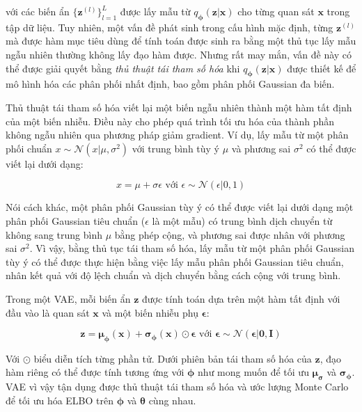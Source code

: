 \documentclass[14pt, a4paper]{article}
\numberwithin{equation}{section}
\numberwithin{figure}{section}
\numberwithin{dl}{section}
\numberwithin{md}{section}
\numberwithin{bd}{section}
\numberwithin{dn}{section}
\numberwithin{hq}{section}
\begin{document}
    với các biến ẩn $\lbrace \boldsymbol{z}^{(l)} \rbrace_{l=1}^L$ được lấy mẫu từ $q_{\boldsymbol{\phi}} (\boldsymbol{z} \vert \boldsymbol{x})$ cho từng quan sát $\boldsymbol{x}$ trong tập dữ liệu.
    Tuy nhiên, một vấn đề phát sinh trong cấu hình mặc định, từng $\boldsymbol{z}^{(l)}$ mà được hàm mục tiêu dùng để tính toán được sinh ra bằng một thủ tục lấy mẫu ngẫu nhiên thường không lấy đạo hàm được.
    Nhưng rất may mắn, vấn đề này có thể được giải quyết bằng \textit{thủ thuật tái tham số hóa} khi $q_{\boldsymbol{\phi}} (\boldsymbol{z} \vert \boldsymbol{x})$ được thiết kế để mô hình hóa các phân phối nhất định, bao gồm phân phối Gaussian đa biến.

    Thủ thuật tái tham số hóa viết lại một biến ngẫu nhiên thành một hàm tất định của một biến nhiễu.
    Điều này cho phép quá trình tối ưu hóa của thành phần không ngẫu nhiên qua phương pháp giảm gradient.
    Ví dụ, lấy mẫu từ một phân phối chuẩn $x \sim \mathcal{N} (x \vert \mu, \sigma^2)$ với trung bình tùy ý $\mu$ và phương sai $\sigma^2$ có thể được viết lại dưới dạng:

    \begin{equation}
        x = \mu + \sigma \epsilon \text{ với } \epsilon \sim \mathcal{N} (\epsilon \vert 0, 1)
    \end{equation}

    Nói cách khác, một phân phối Gaussian tùy ý có thể được viết lại dưới dạng một phân phối Gaussian tiêu chuẩn ($\epsilon$ là một mẫu) có trung bình dịch chuyển từ không sang trung bình $\mu$ bằng phép cộng, và phương sai được nhân với phương sai $\sigma^2$.
    Vì vậy, bằng thủ tục tái tham số hóa, lấy mẫu từ một phân phối Gaussian tùy ý có thể được thực hiện bằng việc lấy mẫu phân phối Gaussian tiêu chuẩn, nhân kết quả với độ lệch chuẩn và dịch chuyển bằng cách cộng với trung bình.

    Trong một VAE, mỗi biến ẩn $\boldsymbol{z}$ được tính toán dựa trên một hàm tất định với đầu vào là quan sát $\boldsymbol{x}$ và một biến nhiễu phụ $\boldsymbol{\epsilon}$:

    \begin{equation}
        \boldsymbol{z} = \boldsymbol{\mu}_{\boldsymbol{\phi}} (\boldsymbol{x}) + \boldsymbol{\sigma}_{\boldsymbol{\phi}} (\boldsymbol{x}) \odot \boldsymbol{\epsilon} \text{ với } \boldsymbol{\epsilon} \sim \mathcal{N} (\boldsymbol{\epsilon} \vert \boldsymbol{0}, \boldsymbol{I})
    \end{equation}

    Với $\odot$ biểu diễn tích từng phần tử.
    Dưới phiên bản tái tham số hóa của $\boldsymbol{z}$, đạo hàm riêng có thể được tính tương ứng với $\boldsymbol{\phi}$ như mong muốn để tối ưu $\boldsymbol{\mu}_{\boldsymbol{\sigma}}$ và $\boldsymbol{\sigma}_{\boldsymbol{\phi}}$.
    VAE vì vậy tận dụng được thủ thuật tái tham số hóa và ước lượng Monte Carlo để tối ưu hóa ELBO trên $\boldsymbol{\phi}$ và $\boldsymbol{\theta}$ cùng nhau.
\end{document}
